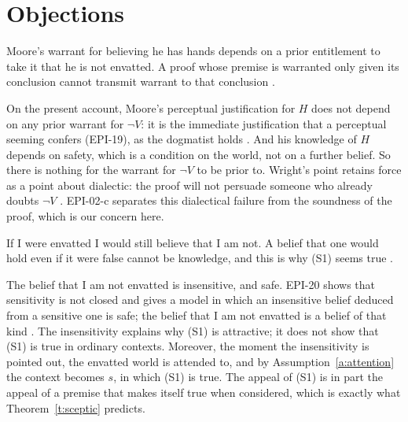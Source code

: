 \documentclass{situationist-preprint}
\begin{document}
\section{Objections}

\begin{objection}
Moore's warrant for believing he has hands depends on a prior entitlement to take it that he is not envatted. A proof whose premise is warranted only given its conclusion cannot transmit warrant to that conclusion \citep{Wright2002}.
\end{objection}

\begin{reply}
On the present account, Moore's perceptual justification for $H$ does not depend on any prior warrant for $\neg V$: it is the immediate justification that a perceptual seeming confers (EPI-19), as the dogmatist holds \citep{Pryor2000}. And his knowledge of $H$ depends on safety, which is a condition on the world, not on a further belief. So there is nothing for the warrant for $\neg V$ to be prior to. Wright's point retains force as a point about dialectic: the proof will not persuade someone who already doubts $\neg V$ \citep{Pryor2004}. EPI-02-c separates this dialectical failure from the soundness of the proof, which is our concern here.
\end{reply}

\begin{objection}[Insensitivity]
If I were envatted I would still believe that I am not. A belief that one would hold even if it were false cannot be knowledge, and this is why (S1) seems true \citep{Nozick1981,DeRose1995}.
\end{objection}

\begin{reply}
The belief that I am not envatted is insensitive, and safe. EPI-20 shows that sensitivity is not closed and gives a model in which an insensitive belief deduced from a sensitive one is safe; the belief that I am not envatted is a belief of that kind \citep{Sosa1999}. The insensitivity explains why (S1) is attractive; it does not show that (S1) is true in ordinary contexts. Moreover, the moment the insensitivity is pointed out, the envatted world is attended to, and by Assumption~\ref{a:attention} the context becomes $s$, in which (S1) is true. The appeal of (S1) is in part the appeal of a premise that makes itself true when considered, which is exactly what Theorem~\ref{t:sceptic} predicts.
\end{reply}
\end{document}
